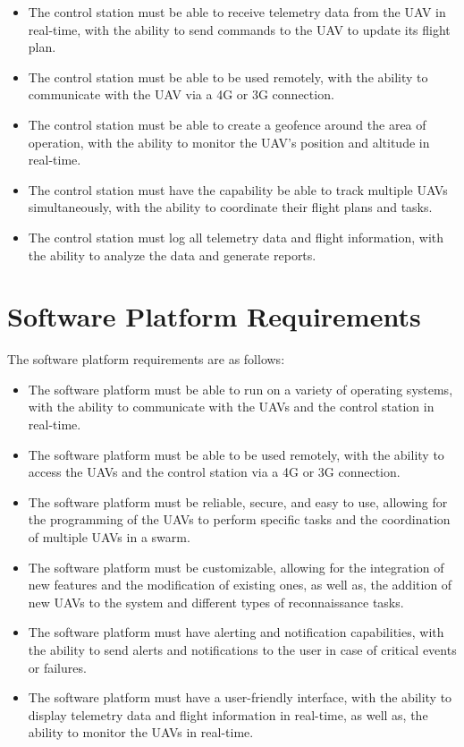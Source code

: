 \begin{itemize}
  \item The control station must be able to receive telemetry data from the UAV in real-time, with the ability to send commands to the UAV to update its flight plan.

  \item The control station must be able to be used remotely, with the ability to communicate with the UAV via a 4G or 3G connection.

  \item The control station must be able to create a geofence around the area of operation, with the ability to monitor the UAV's position and altitude in real-time.

  \item The control station must have the capability be able to track multiple UAVs simultaneously, with the ability to coordinate their flight plans and tasks.

  \item The control station must log all telemetry data and flight information, with the ability to analyze the data and generate reports.
\end{itemize}

\section{Software Platform Requirements}

The software platform requirements are as follows:

\begin{itemize}
  \item The software platform must be able to run on a variety of operating systems, with the ability to communicate with the UAVs and the control station in real-time.

  \item The software platform must be able to be used remotely, with the ability to access the UAVs and the control station via a 4G or 3G connection.

  \item The software platform must be reliable, secure, and easy to use, allowing for the programming of the UAVs to perform specific tasks and the coordination of multiple UAVs in a swarm.

  \item The software platform must be customizable, allowing for the integration of new features and the modification of existing ones, as well as, the addition of new UAVs to the system and different types of reconnaissance tasks.

  \item The software platform must have alerting and notification capabilities, with the ability to send alerts and notifications to the user in case of critical events or failures.

  \item The software platform must have a user-friendly interface, with the ability to display telemetry data and flight information in real-time, as well as, the ability to monitor the UAVs in real-time.
\end{itemize}
